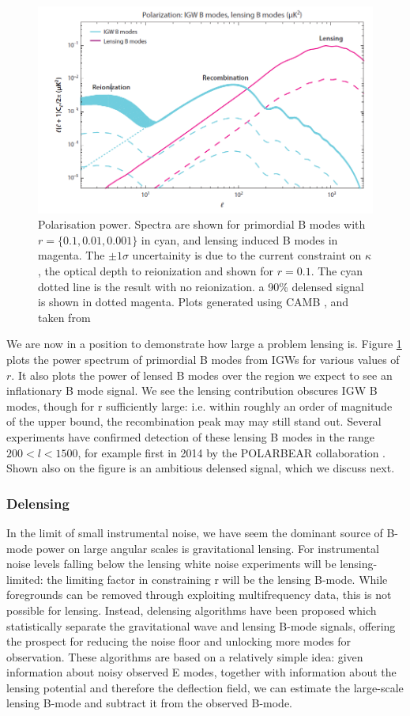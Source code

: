\documentclass[a4paper,10pt]{article}
\begin{document}
\begin{figure}[h]
  \includegraphics[width=0.7\linewidth]{lensingfucksus.png}
  \centering
  \caption{Polarisation power. Spectra are shown for primordial B modes with $r=\{0.1,0.01,0.001\}$ in cyan, and lensing induced B modes in magenta. The $\pm1\sigma$ uncertainity is due to the current constraint on $\kappa$, the optical depth to reionization and shown for $r=0.1$. The cyan dotted line is the result with no reionization. a 90\% delensed signal is shown in dotted magenta. Plots generated using CAMB \cite{CAMBInfo}, and taken from \cite{QBM}}
  \label{lensingisfucked}
\end{figure}

We are now in a position to demonstrate how large a problem lensing is. Figure \ref{lensingisfucked} plots the power spectrum of primordial B modes from IGWs for various values of $r$. It also plots the power of lensed B modes over the region we expect to see an inflationary B mode signal. We see the lensing contribution obscures IGW B modes, though for r sufficiently large: i.e. within roughly an order of magnitude of the upper bound, the recombination peak may may still stand out. Several experiments have confirmed detection of these lensing B modes in the range $200<l<1500$, for example first in 2014 by the POLARBEAR collaboration \cite{polarbear}. Shown also on the figure is an ambitious delensed signal, which we discuss next.

\subsubsection{Delensing}

In the limit of small instrumental noise, we have seem the dominant source of B-mode power on large angular scales is gravitational lensing. For instrumental noise levels falling below the lensing white noise experiments will be lensing-limited: the limiting factor in constraining r will be the lensing B-mode. While foregrounds can be removed through exploiting multifrequency data, this is not possible for lensing. Instead, delensing algorithms have been proposed  which statistically separate the gravitational wave and lensing B-mode signals, offering the prospect for reducing the noise floor and unlocking more modes for observation. These algorithms are based on a relatively simple idea: given information about noisy observed E modes, together with information about the lensing potential and therefore the deflection field, we can estimate the large-scale lensing B-mode and subtract it from the observed B-mode.\\
\end{document}
